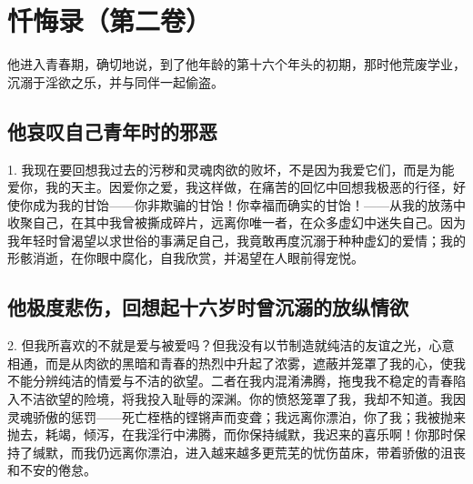 

\section{忏悔录（第二卷）}

他进入青春期，确切地说，到了他年龄的第十六个年头的初期，那时他荒废学业，沉溺于淫欲之乐，并与同伴一起偷盗。\par


\subsection{他哀叹自己青年时的邪恶}

1. 我现在要回想我过去的污秽和灵魂肉欲的败坏，不是因为我爱它们，而是为能爱你，我的天主。因爱你之爱，我这样做，在痛苦的回忆中回想我极恶的行径，好使你成为我的甘饴——你非欺骗的甘饴！你幸福而确实的甘饴！——从我的放荡中收聚自己，在其中我曾被撕成碎片，远离你唯一者，在众多虚幻中迷失自己。因为我年轻时曾渴望以求世俗的事满足自己，我竟敢再度沉溺于种种虚幻的爱情；我的形骸消逝，在你眼中腐化，自我欣赏，并渴望在人眼前得宠悦。\par


\subsection{他极度悲伤，回想起十六岁时曾沉溺的放纵情欲}

2. 但我所喜欢的不就是爱与被爱吗？但我没有以节制造就纯洁的友谊之光，心意相通，而是从肉欲的黑暗和青春的热烈中升起了浓雾，遮蔽并笼罩了我的心，使我不能分辨纯洁的情爱与不洁的欲望。二者在我内混淆沸腾，拖曳我不稳定的青春陷入不洁欲望的险境，将我投入耻辱的深渊。你的愤怒笼罩了我，我却不知道。我因灵魂骄傲的惩罚——死亡桎梏的铿锵声而变聋；我远离你漂泊，你了我；我被抛来抛去，耗竭，倾泻，在我淫行中沸腾，而你保持缄默，我迟来的喜乐啊！你那时保持了缄默，而我仍远离你漂泊，进入越来越多更荒芜的忧伤苗床，带着骄傲的沮丧和不安的倦怠。\par

